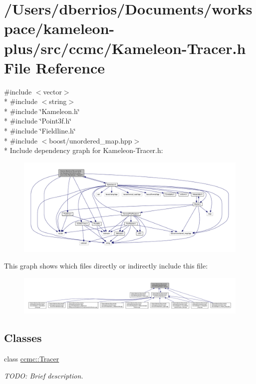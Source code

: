 \hypertarget{_kameleon-_tracer_8h}{\section{/\-Users/dberrios/\-Documents/workspace/kameleon-\/plus/src/ccmc/\-Kameleon-\/\-Tracer.h File Reference}
\label{_kameleon-_tracer_8h}
}
{\ttfamily \#include $<$vector$>$}\\*
{\ttfamily \#include $<$string$>$}\\*
{\ttfamily \#include \char`\"{}Kameleon.\-h\char`\"{}}\\*
{\ttfamily \#include \char`\"{}Point3f.\-h\char`\"{}}\\*
{\ttfamily \#include \char`\"{}Fieldline.\-h\char`\"{}}\\*
{\ttfamily \#include $<$boost/unordered\-\_\-map.\-hpp$>$}\\*
Include dependency graph for Kameleon-\/\-Tracer.h\-:
\nopagebreak
\begin{figure}[H]
\begin{center}
\leavevmode
\includegraphics[width=350pt]{_kameleon-_tracer_8h__incl}
\end{center}
\end{figure}
This graph shows which files directly or indirectly include this file\-:
\nopagebreak
\begin{figure}[H]
\begin{center}
\leavevmode
\includegraphics[width=350pt]{_kameleon-_tracer_8h__dep__incl}
\end{center}
\end{figure}
\subsection*{Classes}
\begin{DoxyCompactItemize}
\item 
class \hyperlink{classccmc_1_1_tracer}{ccmc\-::\-Tracer}
\begin{DoxyCompactList}\small\item\em T\-O\-D\-O\-: Brief description. \end{DoxyCompactList}\end{DoxyCompactItemize}
